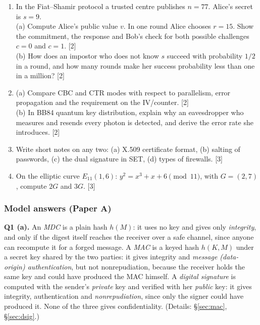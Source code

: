 \begin{enumerate}[leftmargin=2em,itemsep=6pt,label=\textbf{Q\arabic*.}]
\item In the Fiat--Shamir protocol a trusted centre publishes $n = 77$. Alice's secret is $s = 9$.\\
(a) Compute Alice's public value $v$. In one round Alice chooses $r = 15$. Show the commitment, the response and Bob's check for both possible challenges $c = 0$ and $c = 1$. \hfill [2]\\
(b) How does an impostor who does not know $s$ succeed with probability $1/2$ in a round, and how many rounds make her success probability less than one in a million? \hfill [2]

\item (a) Compare CBC and CTR modes with respect to parallelism, error propagation and the requirement on the IV/counter. \hfill [2]\\
(b) In BB84 quantum key distribution, explain why an eavesdropper who measures and resends every photon is detected, and derive the error rate she introduces. \hfill [2]

\item Write short notes on any two: (a) X.509 certificate format, (b) salting of passwords, (c) the dual signature in SET, (d) types of firewalls. \hfill [3]

\item On the elliptic curve $E_{11}(1, 6)$: $y^2 = x^3 + x + 6 \pmod{11}$, with $G = (2, 7)$, compute $2G$ and $3G$. \hfill [3]
\end{enumerate}

\subsubsection*{Model answers (Paper A)}

\textbf{Q1 (a).} An \emph{MDC} is a plain hash $h(M)$: it uses no key and gives only \emph{integrity}, and only if the digest itself reaches the receiver over a safe channel, since anyone can recompute it for a forged message. A \emph{MAC} is a keyed hash $h(K, M)$ under a secret key shared by the two parties: it gives integrity and \emph{message (data-origin) authentication}, but not nonrepudiation, because the receiver holds the same key and could have produced the MAC himself. A \emph{digital signature} is computed with the sender's \emph{private} key and verified with her \emph{public} key: it gives integrity, authentication and \emph{nonrepudiation}, since only the signer could have produced it. None of the three gives confidentiality. (Details: \S\ref{sec:mac}, \S\ref{sec:dsig}.)


